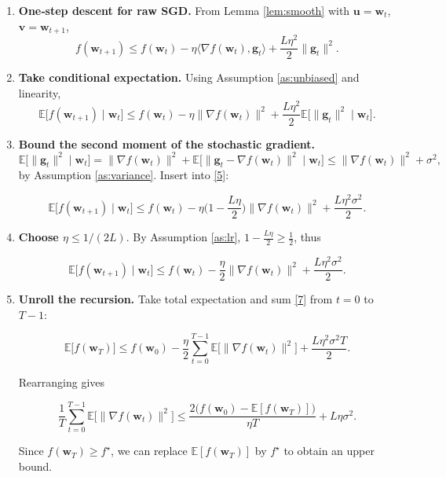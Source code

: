 \documentclass{article}
\begin{document}
\begin{enumerate}
\item[Step 1.] \textbf{One‑step descent for raw SGD.}  
From Lemma \ref{lem:smooth} with $\mathbf{u}=\mathbf{w}_t$, $\mathbf{v}=\mathbf{w}_{t+1}$,
\[
f(\mathbf{w}_{t+1})\le f(\mathbf{w}_t)-\eta\langle\nabla f(\mathbf{w}_t),\mathbf{g}_t\rangle+\frac{L\eta^2}{2}\|\mathbf{g}_t\|^2. \tag{4}
\]

\item[Step 2.] \textbf{Take conditional expectation.}  
Using Assumption \ref{as:unbiased} and linearity,
\[
\mathbb{E}\!\big[f(\mathbf{w}_{t+1})\mid\mathbf{w}_t\big]
\le f(\mathbf{w}_t)-\eta\|\nabla f(\mathbf{w}_t)\|^2+\frac{L\eta^2}{2}\mathbb{E}\!\big[\|\mathbf{g}_t\|^2\mid\mathbf{w}_t\big]. \tag{5}
\]

\item[Step 3.] \textbf{Bound the second moment of the stochastic gradient.}  
\[
\mathbb{E}\!\big[\|\mathbf{g}_t\|^2\mid\mathbf{w}_t\big]
= \|\nabla f(\mathbf{w}_t)\|^2+\mathbb{E}\!\big[\|\mathbf{g}_t-\nabla f(\mathbf{w}_t)\|^2\mid\mathbf{w}_t\big]
\le \|\nabla f(\mathbf{w}_t)\|^2+\sigma^2,
\]
by Assumption \ref{as:variance}. Insert into \eqref{5}:

\[
\mathbb{E}\!\big[f(\mathbf{w}_{t+1})\mid\mathbf{w}_t\big]
\le f(\mathbf{w}_t)-\eta\Big(1-\frac{L\eta}{2}\Big)\|\nabla f(\mathbf{w}_t)\|^2+\frac{L\eta^2\sigma^2}{2}. \tag{6}
\]

\item[Step 4.] \textbf{Choose $\eta\le 1/(2L)$}.  
By Assumption \ref{as:lr}, $1-\frac{L\eta}{2}\ge\frac12$, thus

\[
\mathbb{E}\!\big[f(\mathbf{w}_{t+1})\mid\mathbf{w}_t\big]
\le f(\mathbf{w}_t)-\frac{\eta}{2}\|\nabla f(\mathbf{w}_t)\|^2+\frac{L\eta^2\sigma^2}{2}. \tag{7}
\]

\item[Step 5.] \textbf{Unroll the recursion.}  
Take total expectation and sum \eqref{7} from $t=0$ to $T-1$:

\[
\mathbb{E}\big[f(\mathbf{w}_T)\big]
\le f(\mathbf{w}_0)-\frac{\eta}{2}\sum_{t=0}^{T-1}\mathbb{E}\big[\|\nabla f(\mathbf{w}_t)\|^2\big]
+ \frac{L\eta^2\sigma^2 T}{2}. \tag{8}
\]

Rearranging gives

\[
\frac{1}{T}\sum_{t=0}^{T-1}\mathbb{E}\big[\|\nabla f(\mathbf{w}_t)\|^2\big]
\le \frac{2\big(f(\mathbf{w}_0)-\mathbb{E}[f(\mathbf{w}_T)]\big)}{\eta T}
+L\eta\sigma^2. \tag{9}
\]

Since $f(\mathbf{w}_T)\ge f^\star$, we can replace $\mathbb{E}[f(\mathbf{w}_T)]$ by $f^\star$ to obtain an upper bound.


\end{enumerate}
\end{document}
